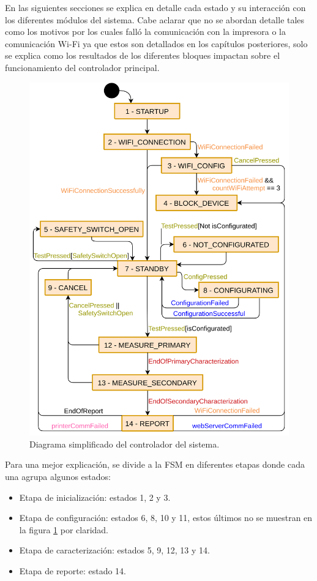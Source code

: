 En las siguientes secciones se explica en detalle cada estado y su interacción con los diferentes módulos del sistema. Cabe aclarar que no se abordan detalle tales como los motivos por los cuales falló la comunicación con la impresora o la comunicación Wi-Fi ya que estos son detallados en los capítulos posteriores, solo se explica como los resultados de los diferentes bloques impactan sobre el funcionamiento del controlador principal.
\pagebreak
\begin{figure}[ht]
	\centering
	\includegraphics[scale=1]{./Figures/MainFSM_red.png}
	\caption{Diagrama simplificado del controlador del sistema.}
	\label{fig:MainFSM_red}
\end{figure}

Para una mejor explicación, se divide a la FSM en diferentes etapas donde cada una agrupa algunos estados:
\begin{itemize}
\item Etapa de inicialización: estados 1, 2 y 3.
\item Etapa de configuración: estados 6, 8, 10 y 11, estos últimos no se muestran en la figura \ref{fig:MainFSM_red} por claridad.
\item Etapa de caracterización: estados 5, 9, 12, 13 y 14.
\item Etapa de reporte: estado 14.
\end{itemize}

